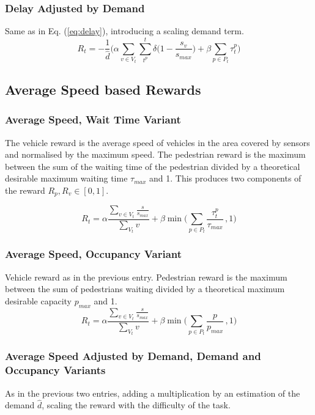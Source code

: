 \documentclass[conference]{IEEEtran}
\begin{document}
\subsubsection{Delay Adjusted by Demand}
Same as in Eq. (\ref{eq:delay}), introducing a scaling demand term.
\begin{equation}
    R_t = -\frac{1}{\hat{d}} \bigg( \alpha \sum_{v\in V_t}  \sum_{t^p}^t \delta \big( 1-\frac{s_v}{s_{max}} \big) + \beta \sum_{p \in P_t} \tau^p_{t} \bigg)
\label{eq:delay_ad}
\end{equation}

\subsection{Average Speed based Rewards}
\subsubsection{Average Speed, Wait Time Variant}
The vehicle reward is the average speed of vehicles in the area covered by sensors and normalised by the maximum speed.
The pedestrian reward is the maximum between the sum of the waiting time of the pedestrian divided by a theoretical desirable maximum waiting time $\tau_{max}$ and 1.
This produces two components of the reward $R_p, R_v \in [0,1]$.

\begin{equation}
    R_t = \alpha \frac{\sum_{v \in V_t} \frac{s}{s_{max}}}{\sum_{V_t} v}  + \beta \min \big( \sum_{p \in P_t} \frac{\tau^p_{t}}{\tau_{max}} \, , 1 \big)
\label{eq:avgspeed_wait}
\end{equation}

\subsubsection{Average Speed, Occupancy Variant}
Vehicle reward as in the previous entry.
Pedestrian reward is the maximum between the sum of pedestrians waiting divided by a theoretical maximum desirable capacity $p_{max}$ and 1. 
\begin{equation}
    R_t =   \alpha \frac{ \sum_{v \in V_t} \frac{s}{s_{max}}}{\sum_{V_t} v} + \beta \min \big( \sum_{p \in P_t} \frac{p}{p_{max}} \, , 1 \big)
\label{eq:avgspeed_occ}
\end{equation}

\subsubsection{Average Speed Adjusted by Demand, Demand and Occupancy Variants}
As in the previous two entries, adding a multiplication by an estimation of the demand $\hat{d}$, scaling the reward with the difficulty of the task.
\end{document}
